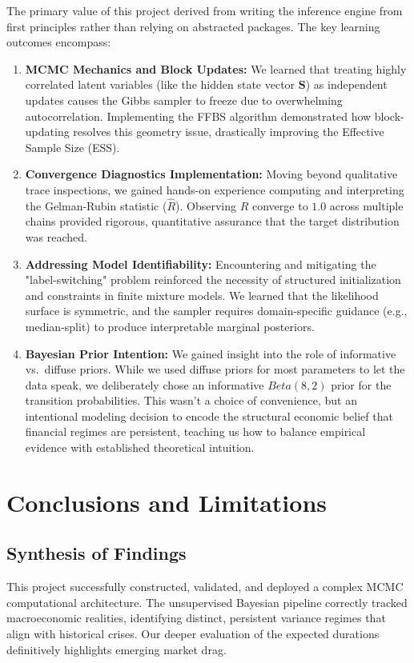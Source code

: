 \documentclass[12pt, a4paper]{article}
\begin{document}
The primary value of this project derived from writing the inference engine from first principles rather than relying on abstracted packages. The key learning outcomes encompass:
\begin{enumerate}
    \item \textbf{MCMC Mechanics and Block Updates:} We learned that treating highly correlated latent variables (like the hidden state vector $\mathbf{S}$) as independent updates causes the Gibbs sampler to freeze due to overwhelming autocorrelation. Implementing the FFBS algorithm demonstrated how block-updating resolves this geometry issue, drastically improving the Effective Sample Size (ESS).
    \item \textbf{Convergence Diagnostics Implementation:} Moving beyond qualitative trace inspections, we gained hands-on experience computing and interpreting the Gelman-Rubin statistic ($\hat{R}$). Observing $\hat{R}$ converge to $1.0$ across multiple chains provided rigorous, quantitative assurance that the target distribution was reached.
    \item \textbf{Addressing Model Identifiability:} Encountering and mitigating the "label-switching" problem reinforced the necessity of structured initialization and constraints in finite mixture models. We learned that the likelihood surface is symmetric, and the sampler requires domain-specific guidance (e.g., median-split) to produce interpretable marginal posteriors.
    \item \textbf{Bayesian Prior Intention:} We gained insight into the role of informative vs.\ diffuse priors. While we used diffuse priors for most parameters to let the data speak, we deliberately chose an informative $Beta(8,2)$ prior for the transition probabilities. This wasn't a choice of convenience, but an intentional modeling decision to encode the structural economic belief that financial regimes are persistent, teaching us how to balance empirical evidence with established theoretical intuition.
\end{enumerate}

\section{Conclusions and Limitations}

\subsection{Synthesis of Findings}
This project successfully constructed, validated, and deployed a complex MCMC computational architecture. The unsupervised Bayesian pipeline correctly tracked macroeconomic realities, identifying distinct, persistent variance regimes that align with historical crises. Our deeper evaluation of the expected durations definitively highlights emerging market drag.
\end{document}
